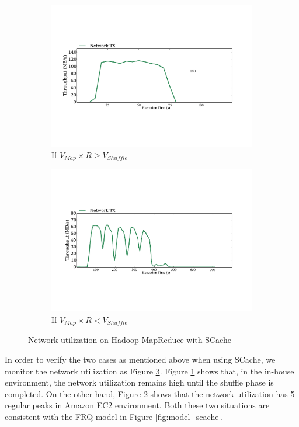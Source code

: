 {\begin{figure}
	\centering
	\begin{subfigure}{.47\linewidth}
		\includegraphics[width=\linewidth]{fig/hadoop_net1}
		\caption{\color{blue}If \(V_{Map} \times R \ge V_{Shuffle}\)}
		\label{fig:hadoop_net1}
	\end{subfigure}
	\begin{subfigure}{.47\linewidth}
		\includegraphics[width=\linewidth]{fig/hadoop_net2}
		\caption{\color{blue}If \(V_{Map} \times R < V_{Shuffle}\)}
		\label{fig:hadoop_net2}
	\end{subfigure}
	\caption{\color{blue}Network utilization on Hadoop MapReduce with SCache}
	\label{fig:hadoop_net}
\end{figure}

In order to verify the two cases as mentioned above when using SCache, we monitor the network utilization as Figure \ref{fig:hadoop_net}. Figure \ref{fig:hadoop_net1} shows that, in the in-house environment, the network utilization remains high until the shuffle phase is completed. On the other hand, Figure \ref{fig:hadoop_net2} shows that the network utilization has 5 regular peaks in Amazon EC2 environment. 
Both these two situations are consistent with the FRQ model in Figure \ref{fig:model_scache}. 

}
